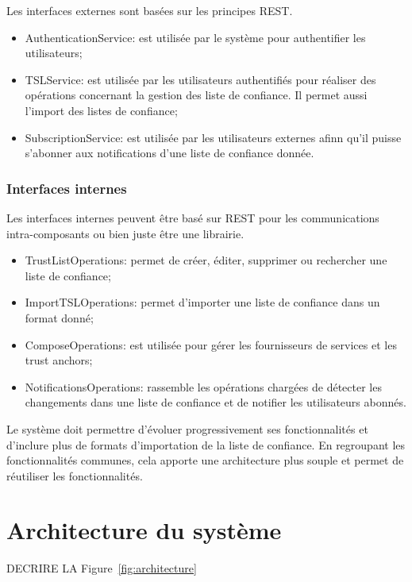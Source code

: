 \documentclass{tnreport}
\begin{document}
Les interfaces externes sont basées sur les principes REST.

\begin{itemize}
	\item AuthenticationService: est utilisée par le système pour authentifier les utilisateurs;
	\item TSLService: est utilisée par les utilisateurs authentifiés pour réaliser des opérations concernant la gestion des liste de confiance. Il permet aussi l'import des listes de confiance;
	\item SubscriptionService: est utilisée par les utilisateurs externes afinn qu'il puisse s'abonner aux notifications d'une liste de confiance donnée.
\end{itemize}

\subsubsection{Interfaces internes}

Les interfaces internes peuvent être basé sur REST pour les communications intra-composants ou bien juste être une librairie.

\begin{itemize}
	\item TrustListOperations: permet de créer, éditer, supprimer ou rechercher une liste de confiance;
	\item ImportTSLOperations: permet d'importer une liste de confiance dans un format donné;
	\item ComposeOperations: est utilisée pour gérer les fournisseurs de services et les trust anchors;
	\item NotificationsOperations: rassemble les opérations chargées de détecter les changements dans une liste de confiance et de notifier les utilisateurs abonnés.
\end{itemize}

Le système doit permettre d'évoluer progressivement ses fonctionnalités et d'inclure plus de formats d'importation de la liste de confiance. En regroupant les fonctionnalités communes, cela apporte une architecture plus souple et permet de réutiliser les fonctionnalités.

\section{Architecture du système}

DECRIRE LA Figure~\ref{fig:architecture}
\end{document}
